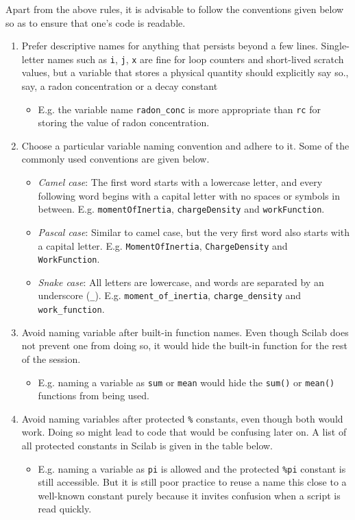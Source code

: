 		Apart from the above rules, it is advisable to follow the conventions given below so as to ensure that one's code is readable.
		\begin{enumerate}
			\item Prefer descriptive names for anything that persists beyond a few lines. Single-letter names such as \verb|i|, \verb|j|, \verb|x| are fine for loop counters and short-lived scratch values, but a variable that stores a physical quantity should explicitly say so., say, a radon concentration or a decay constant 
			\begin{itemize}
				\item E.g. the variable name \verb|radon_conc| is more appropriate than \verb|rc| for storing the value of radon concentration.
			\end{itemize}
			
			\item Choose a particular variable naming convention and adhere to it. Some of the commonly used conventions are given below.
			\begin{itemize}
				\item \emph{Camel case}: The first word starts with a lowercase letter, and every following word begins with a capital letter with no spaces or symbols in between. E.g. \verb|momentOfInertia|, \verb|chargeDensity| and \verb|workFunction|.
				\item \emph{Pascal case}: Similar to camel case, but the very first word also starts with a capital letter. E.g. \verb|MomentOfInertia|, \verb|ChargeDensity| and \verb|WorkFunction|.
				\item \emph{Snake case}: All letters are lowercase, and words are separated by an underscore (\verb|_|). E.g. \verb|moment_of_inertia|, \verb|charge_density| and \verb|work_function|.
			\end{itemize}
						
			\item Avoid naming variable after built-in function names. Even though Scilab does not prevent one from doing so, it would hide the built-in function for the rest of the session.
			\begin{itemize}
				\item E.g. naming a variable as \verb|sum| or \verb|mean| would hide the \verb|sum()| or \verb|mean()| functions from being used.
			\end{itemize}
			
			\item Avoid naming variables after protected \verb|%| constants, even though both would work. Doing so might lead to code that would be confusing later on. A list of all protected constants in Scilab is given in the table below.
			\begin{itemize}
				\item E.g. naming a variable as \verb|pi| is allowed and the protected \verb|%pi| constant is still accessible. But it is still poor practice to reuse a name this close to a well-known constant purely because it invites confusion when a script is read quickly.
			\end{itemize}
		\end{enumerate}
